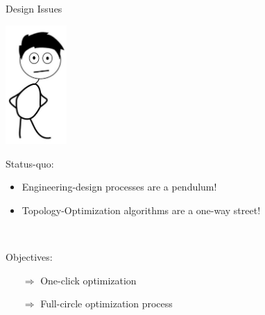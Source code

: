 \begin{frame}{Design Issues}
	
	\includegraphics[width=0.175\textwidth, center]{Pictures/animations/animation_designer_sad}
	
	\begin{multicols}{2}
		\begin{block}{Status-quo:}{
		\begin{itemize}		
			\item Engineering-design processes are a pendulum!
			\item Topology-Optimization algorithms are a one-way street!
		\end{itemize}~\\
		}
		\end{block}
		\columnbreak

		\begin{block}{Objectives:}{
		\begin{itemize}		
			\item[$\Rightarrow$] One-click optimization
		\end{itemize}
		\begin{itemize}		
			\item[$\Rightarrow$] Full-circle optimization process	
		\end{itemize}
		}
		\end{block}
				
		\end{multicols}

\end{frame}	

